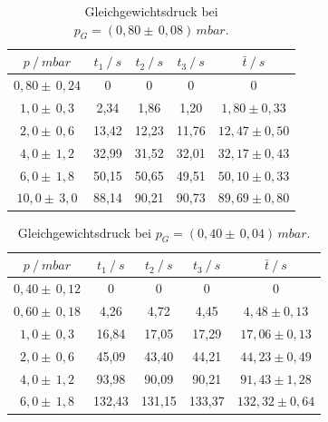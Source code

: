 \begin{table}[H]
\centering
\begin{tabular}{c|c|c|c|c}
	{$p \:/\: \si{mbar}$} & {$t_1 \:/\: \si{s} $} & {$t_2 \:/\: \si{s} $} & {$t_3 \:/\: \si{s} $} & {$\bar{t} \:/\: \si{s}$}\\
\midrule
$0,80 \pm \, 0,24$ &0 &0 &0 &0\\
$1,0 \pm \, 0,3$ &   2,34 &  1,86 &  1,20 & $1,80 \pm 0,33$\\
$2,0 \pm \, 0,6$ &   13,42  &  12,23 &  11,76 & $12,47 \pm 0,50 $\\
$4,0 \pm \, 1,2$ &   32,99 &  31,52 &  32,01 & $32,17 \pm 0,43 $\\
$6,0 \pm \, 1,8$  &   50,15 &  50,65 &  49,51 & $50,10 \pm 0,33 $\\
$10,0 \pm \, 3,0$ &   88,14 &  90,21 &  90,73 & $89,69 \pm 0,80 $\\
\end{tabular}
\caption{Gleichgewichtsdruck bei $p_G=(0,80 \pm \, 0,08) \, \si{mbar}$.}
\label{tab:leck_Dreh2}
\end{table}

\begin{table}[H]
\centering
\begin{tabular}{c|c|c|c|c}
	{$p \:/\: \si{mbar}$} & {$t_1 \:/\: \si{s} $} & {$t_2 \:/\: \si{s} $} & {$t_3 \:/\: \si{s} $} & {$\bar{t} \:/\: \si{s}$}\\
\midrule
$0,40 \pm \, 0,12$ &0 &0 &0 &0\\
$0,60 \pm \, 0,18$ &   4,26 &  4,72 &  4,45 & $4,48 \pm 0,13$\\
$1,0 \pm \, 0,3$ &   16,84  &  17,05 &  17,29 & $17,06 \pm 0,13 $\\
$2,0 \pm \, 0,6$ &   45,09 &  43,40 &  44,21 & $44,23 \pm 0,49 $\\
$4,0 \pm \, 1,2$ &   93,98 &  90,09 & 90,21 & $91,43 \pm 1,28 $\\
$6,0 \pm \, 1,8$ &   132,43 &  131,15 &  133,37 & $132,32 \pm 0,64 $\\
\end{tabular}
\caption{Gleichgewichtsdruck bei $p_G=(0,40 \pm \, 0,04) \, \si{mbar}$.}
\label{tab:leck_Dreh3}
\end{table}

